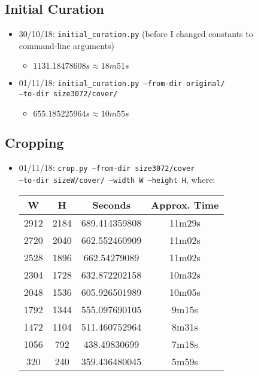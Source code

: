 \documentclass[11pt,a4paper]{report}
\begin{document}
\subsection{Initial Curation}
\begin{itemize}
\item 30/10/18: \texttt{initial\_curation.py} (before I changed constants to \\
         command-line arguments)
  \begin{itemize}
  \item $1131.18478608s \approx 18m51s$
  \end{itemize}

\item 01/11/18: \texttt{initial\_curation.py --from-dir original/} \\ \texttt{--to-dir size3072/cover/}
  \begin{itemize}
  \item $655.185225964s \approx 10m55s$
  \end{itemize}
\end{itemize}


\subsection{Cropping}
\begin{itemize}
\item 01/11/18: \texttt{crop.py --from-dir size3072/cover} \\
         \texttt{--to-dir sizeW/cover/ --width W --height H}, where:
  \begin{center}
  \begin{tabular}{ c c | c c }
  W & H & Seconds & Approx. Time\\ \hline
  2912 & 2184 & 689.414359808 & 11m29s \\
  2720 & 2040 & 662.552460909 & 11m02s \\
  2528 & 1896 & 662.54279089 & 11m02s \\
  2304 & 1728 & 632.872202158 & 10m32s \\
  2048 & 1536 & 605.926501989 & 10m05s \\
  1792 & 1344 & 555.097690105 & 9m15s \\
  1472 & 1104 & 511.460752964 & 8m31s \\
  1056 & 792 & 438.49830699 & 7m18s \\
  320 & 240 & 359.436480045 & 5m59s \\
  \end{tabular}
  \end{center}
\end{itemize}
\end{document}
